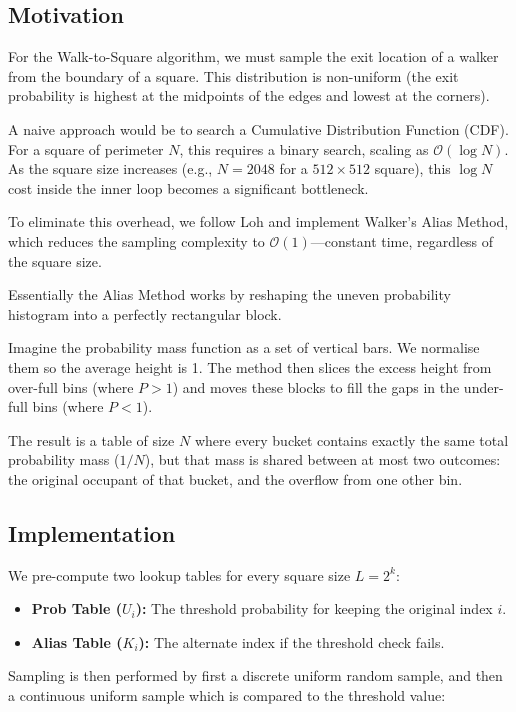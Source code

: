 \documentclass[12pt, a4paper, oneside]{report}
\theoremstyle{remark}
\begin{document}
\subsection{Motivation}
For the Walk-to-Square algorithm, we must sample the exit location of a walker from the boundary of a square. This distribution is non-uniform (the exit probability is highest at the midpoints of the edges and lowest at the corners).

A naive approach would be to search a Cumulative Distribution Function (CDF). For a square of perimeter $N$, this requires a binary search, scaling as $\mathcal{O}(\log N)$. As the square size increases (e.g., $N=2048$ for a $512 \times 512$ square), this $\log N$ cost inside the inner loop becomes a significant bottleneck.

To eliminate this overhead, we follow Loh and implement Walker's Alias Method, which reduces the sampling complexity to $\mathcal{O}(1)$—constant time, regardless of the square size.

Essentially the Alias Method works by reshaping the uneven probability histogram into a perfectly rectangular block.

Imagine the probability mass function as a set of vertical bars. We normalise them so the average height is 1. The method then slices the excess height from over-full bins (where $P > 1$) and moves these blocks to fill the gaps in the under-full bins (where $P < 1$).

The result is a table of size $N$ where every bucket contains exactly the same total probability mass ($1/N$), but that mass is shared between at most two outcomes: the original occupant of that bucket, and the overflow from one other bin.

\subsection{Implementation}
We pre-compute two lookup tables for every square size $L=2^k$:
\begin{itemize}
    \item \textbf{Prob Table ($U_i$):} The threshold probability for keeping the original index $i$.
    \item \textbf{Alias Table ($K_i$):} The alternate index if the threshold check fails.
\end{itemize}

Sampling is then performed by first a discrete uniform random sample, and then a continuous uniform sample which is compared to the threshold value:
\end{document}
